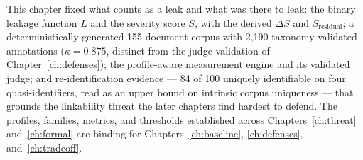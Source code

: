 \documentclass[11pt,a4paper]{report}
\begin{document}
This chapter fixed what counts as a leak and what was there to leak: the binary leakage function
$L$ and the severity score $S$, with the derived $\Delta S$ and $\bar{S}_{\text{residual}}$; a
deterministically generated 155-document corpus with 2{,}190 taxonomy-validated annotations
($\kappa = 0.875$, distinct from the judge validation of Chapter~\ref{ch:defenses}); the
profile-aware measurement engine and its validated judge; and re-identification evidence --- 84
of 100 uniquely identifiable on four quasi-identifiers, read as an upper bound on intrinsic
corpus uniqueness --- that grounds the linkability threat the later chapters find hardest to
defend. The profiles, families, metrics, and thresholds established across
Chapters~\ref{ch:threat} and~\ref{ch:formal} are binding for Chapters~\ref{ch:baseline},
\ref{ch:defenses}, and~\ref{ch:tradeoff}.

\ifdefined\ThesisMaster\else
  
\end{document}
